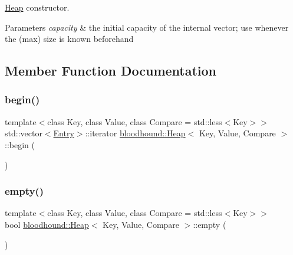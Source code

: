 \hyperlink{classbloodhound_1_1Heap}{Heap} constructor.


\begin{DoxyParams}{Parameters}
{\em capacity} & the initial capacity of the internal vector; use whenever the (max) size is known beforehand \\
\hline
\end{DoxyParams}


\subsection{Member Function Documentation}
\mbox{\label{classbloodhound_1_1Heap_a4f854be1d5a292ee3854373367ca89f3}} 
\subsubsection{\texorpdfstring{begin()}{begin()}}
{\footnotesize\ttfamily template$<$class Key, class Value, class Compare = std\+::less$<$\+Key$>$$>$ \\
std\+::vector$<$\hyperlink{structbloodhound_1_1Heap_1_1Entry}{Entry}$>$\+::iterator \hyperlink{classbloodhound_1_1Heap}{bloodhound\+::\+Heap}$<$ Key, Value, Compare $>$\+::begin (\begin{DoxyParamCaption}{ }\end{DoxyParamCaption})\hspace{0.3cm}{\ttfamily [inline]}}

\mbox{\label{classbloodhound_1_1Heap_aac3a949dc1e68b9cb50256dd64b0dd0e}} 
\subsubsection{\texorpdfstring{empty()}{empty()}}
{\footnotesize\ttfamily template$<$class Key, class Value, class Compare = std\+::less$<$\+Key$>$$>$ \\
bool \hyperlink{classbloodhound_1_1Heap}{bloodhound\+::\+Heap}$<$ Key, Value, Compare $>$\+::empty (\begin{DoxyParamCaption}{ }\end{DoxyParamCaption})\hspace{0.3cm}{\ttfamily [inline]}}

